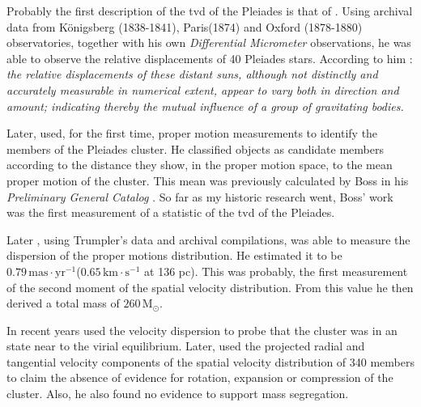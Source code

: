 Probably the first description of the \gls{tvd} of the Pleiades is that of \citet{1884MNRAS..44..355P}. Using archival data from  Königsberg (1838-1841), Paris(1874) and Oxford (1878-1880) observatories, together with his own \emph{Differential Micrometer} observations, he was able to observe the relative displacements of 40 Pleiades stars. According to him \citep{1884MNRAS..44..355P}: \textit{the relative displacements of these distant suns, although not distinctly and accurately measurable in numerical extent, appear to vary both in direction and amount; indicating thereby the mutual influence of a group of gravitating bodies.} 

Later, \citet{Trumpler1921} used, for the first time, proper motion measurements to identify the members of the Pleiades cluster. He classified objects as candidate members according to the distance they show, in the proper motion space, to the mean proper motion of the cluster. This mean was previously calculated by Boss in his \emph{Preliminary General Catalog} \citep{1910pgcs.book.....B}. So far as my historic research went, Boss' work was the first measurement of a statistic of the \gls{tvd} of the Pleiades. 

Later \citet{1938AJ.....47...25T}, using Trumpler's data and archival compilations, was able to measure the dispersion of the proper motions distribution. He estimated it to be $0.79\,\mathrm{mas\cdot yr^{-1}}$($0.65\,\mathrm{ km\cdot s^{-1}}$ at 136 pc). This was probably, the first measurement of the second moment of the spatial velocity distribution. From this value he then derived a total mass of $260\,\mathrm{M_{\odot}}$.

In recent years \citet{Pinfield1998} used the velocity dispersion to probe that the cluster was in an state near to the virial equilibrium. Later, \citet{2006ARep...50..714L} used the projected radial and tangential velocity components of the spatial velocity distribution of 340 members to claim the absence of evidence for rotation, expansion or compression of the cluster. Also, he also found no evidence to support mass segregation. 

